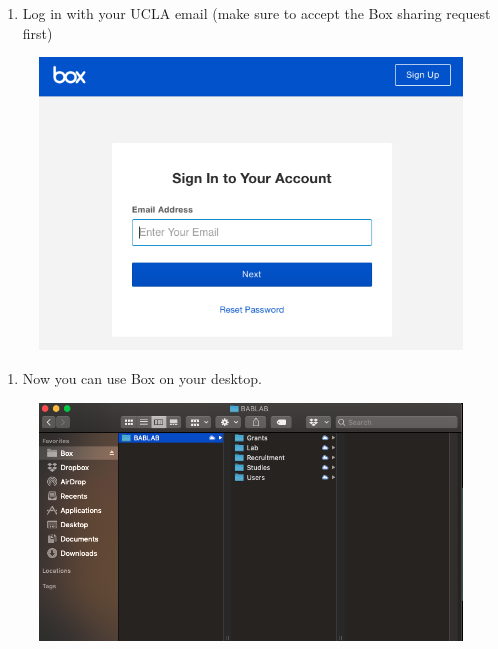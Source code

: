 \documentclass[]{book}
\providecommand{\tightlist}{%
  \setlength{\itemsep}{0pt}\setlength{\parskip}{0pt}}
\begin{document}
\begin{enumerate}
\def\labelenumi{\arabic{enumi}.}
\setcounter{enumi}{2}
\tightlist
\item
  Log in with your UCLA email (make sure to accept the Box sharing
  request first)
\end{enumerate}

\begin{figure}
\centering
\includegraphics{images/lab_protocols/box/3.png}
\caption{}
\end{figure}

\begin{enumerate}
\def\labelenumi{\arabic{enumi}.}
\setcounter{enumi}{3}
\tightlist
\item
  Now you can use Box on your desktop.
\end{enumerate}

\begin{figure}
\centering
\includegraphics{images/lab_protocols/box/4.png}
\caption{}
\end{figure}
\end{document}
